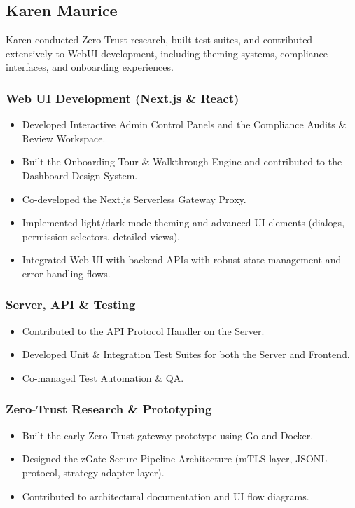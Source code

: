 
\subsection{Karen Maurice}

Karen conducted Zero-Trust research, built test suites, and contributed extensively to WebUI development, including theming systems, compliance interfaces, and onboarding experiences.

\subsubsection{Web UI Development (Next.js \& React)}
\begin{itemize}
    \item Developed Interactive Admin Control Panels and the Compliance Audits \& Review Workspace.
    \item Built the Onboarding Tour \& Walkthrough Engine and contributed to the Dashboard Design System.
    \item Co-developed the Next.js Serverless Gateway Proxy.
    \item Implemented light/dark mode theming and advanced UI elements (dialogs, permission selectors, detailed views).
    \item Integrated Web UI with backend APIs with robust state management and error-handling flows.
\end{itemize}

\subsubsection{Server, API \& Testing}
\begin{itemize}
    \item Contributed to the API Protocol Handler on the Server.
    \item Developed Unit \& Integration Test Suites for both the Server and Frontend.
    \item Co-managed Test Automation \& QA.
\end{itemize}

\subsubsection{Zero-Trust Research \& Prototyping}
\begin{itemize}
    \item Built the early Zero-Trust gateway prototype using Go and Docker.
    \item Designed the zGate Secure Pipeline Architecture (mTLS layer, JSONL protocol, strategy adapter layer).
    \item Contributed to architectural documentation and UI flow diagrams.
\end{itemize}


